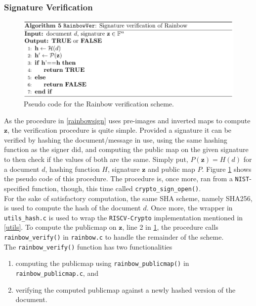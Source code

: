 \subsubsection{Signature Verification} \label{section:message_verif}
\begin{figure}[t]
    \centering
    \includegraphics[width=\textwidth]{resources/rainbowver.png}
    \caption{Pseudo code for the Rainbow verification scheme.}
    \label{rainbowveri}
\end{figure}
As the procedure in \cref{rainbowsign} uses pre-images and inverted maps to compute $\textbf{z}$, the verification procedure is quite simple. Provided a signature it can be verified by hashing the document/message in use, using the same hashing function as the signer did, and computing the public map on the given signature to then check if the values of both are the same. Simply put, $P(\textbf{z}) = H(d)$ for a document $d$, hashing function $H$, signature $\textbf{z}$ and public map $P$. Figure \ref{rainbowveri} shows the pseudo code of this procedure. The procedure is, once more, ran from a \texttt{NIST}-specified function, though, this time called \texttt{crypto\_sign\_open()}.\medskip\\
For the sake of satisfactory computation, the same SHA scheme, namely SHA256, is used to compute the hash of the document $d$. Once more, the wrapper in \texttt{utils\_hash.c} is used to wrap the \texttt{RISCV-Crypto} implementation mentioned in \cref{utils}. To compute the publicmap on $\textbf{z}$, line 2 in \cref{rainbowveri}, the procedure calls \texttt{rainbow\_verify()} in \texttt{rainbow.c} to handle the remainder of the scheme.\medskip\\
The \texttt{rainbow\_verify()} function has two functionalities
\begin{enumerate}
    \item computing the publicmap using \texttt{rainbow\_publicmap()} in\\ \texttt{rainbow\_publicmap.c}, and
    \item verifying the computed publicmap against a newly hashed version of the document.
\end{enumerate}
